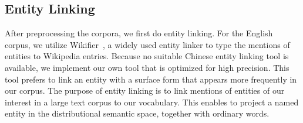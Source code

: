 
\subsection{Entity Linking}
\label{sec:el}
After preprocessing the corpora, we first do entity linking.
For the English corpus, we utilize Wikifier~\cite{cheng2013relational,ratinov2011local}, a widely used
entity linker to type the mentions of entities to Wikipedia entries. 
Because no suitable Chinese entity linking tool is available, 
we implement our own tool that is optimized for high precision. 
This tool prefers to link an entity with a surface form that appears
more frequently in our corpus. 
The purpose of entity linking is to link mentions of entities of
our interest in a large text corpus to our vocabulary.
This enables to project a named entity in the distributional semantic space,
together with ordinary words.
%
%
